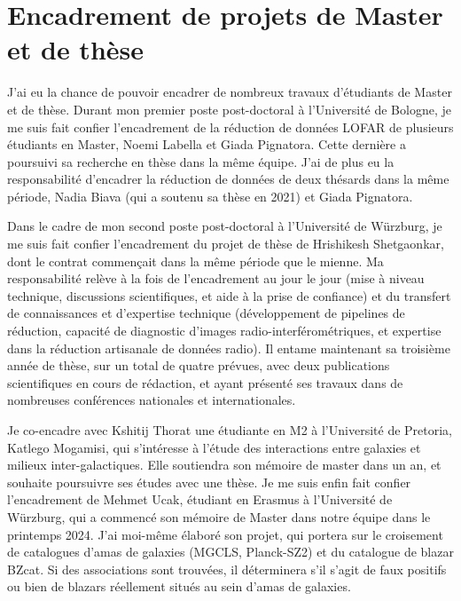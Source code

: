 \section{Encadrement de projets de Master et de th\`ese}

\pg
J'ai eu la chance de pouvoir encadrer de nombreux travaux d'\'etudiants de Master et de th\`ese. Durant mon premier poste post-doctoral \`a l'Universit\'e de Bologne, je me suis fait confier l'encadrement de la r\'eduction de donn\'ees LOFAR de plusieurs \'etudiants en Master, Noemi Labella et Giada Pignatora. Cette derni\`ere a poursuivi sa recherche en th\`ese dans la m\^eme \'equipe. J'ai de plus eu la responsabilit\'e d'encadrer la r\'eduction de donn\'ees de deux th\'esards dans la m\^eme p\'eriode, Nadia Biava (qui a soutenu sa th\`ese en 2021) et Giada Pignatora.

\pg
Dans le cadre de mon second poste post-doctoral \`a l'Universit\'e de W\"urzburg, je me suis fait confier l'encadrement du projet de th\`ese de Hrishikesh Shetgaonkar, dont le contrat commen\c{c}ait dans la m\^eme p\'eriode que le mienne. Ma responsabilit\'e rel\`eve \`a la fois de l'encadrement au jour le jour (mise \`a niveau technique, discussions scientifiques, et aide \`a la prise de confiance) et du transfert de connaissances et d'expertise technique (d\'eveloppement de pipelines de r\'eduction, capacit\'e de diagnostic d'images radio-interf\'erom\'etriques, et expertise dans la r\'eduction artisanale de donn\'ees radio). Il entame maintenant sa troisi\`eme ann\'ee de th\`ese, sur un total de quatre pr\'evues, avec deux publications scientifiques en cours de r\'edaction, et ayant pr\'esent\'e ses travaux dans de nombreuses conf\'erences nationales et internationales. 

\pg
Je co-encadre avec Kshitij Thorat une \'etudiante en M2 \`a l'Universit\'e de Pretoria, Katlego Mogamisi, qui s'int\'eresse \`a l'\'etude des interactions entre galaxies et milieux inter-galactiques. Elle soutiendra son m\'emoire de master dans un an, et souhaite poursuivre ses \'etudes avec une th\`ese. Je me suis enfin fait confier l'encadrement de Mehmet Ucak, \'etudiant en Erasmus \`a l'Universit\'e de W\"urzburg, qui a commenc\'e son m\'emoire de Master dans notre \'equipe dans le printemps 2024. J'ai moi-m\^eme \'elabor\'e son projet, qui portera sur le croisement de catalogues d'amas de galaxies (MGCLS, Planck-SZ2) et du catalogue de blazar BZcat. Si des associations sont trouv\'ees, il d\'eterminera s'il s'agit de faux positifs ou bien de blazars r\'eellement situ\'es au sein d'amas de galaxies. 

